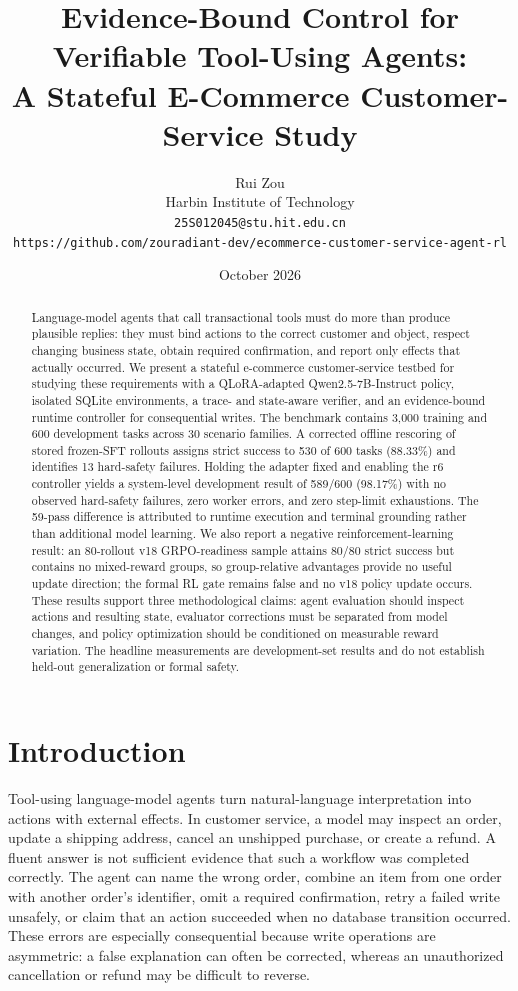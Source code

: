 \documentclass[11pt]{article}
\title{Evidence-Bound Control for Verifiable Tool-Using Agents:\\
A Stateful E-Commerce Customer-Service Study}
\author{Rui Zou\\Harbin Institute of Technology\\
\texttt{25S012045@stu.hit.edu.cn}\\
\texttt{https://github.com/zouradiant-dev/ecommerce-customer-service-agent-rl}}
\date{October 2026}
\begin{document}
\maketitle

\begin{abstract}
Language-model agents that call transactional tools must do more than produce plausible replies: they must bind actions to the correct customer and object, respect changing business state, obtain required confirmation, and report only effects that actually occurred. We present a stateful e-commerce customer-service testbed for studying these requirements with a QLoRA-adapted Qwen2.5-7B-Instruct policy, isolated SQLite environments, a trace- and state-aware verifier, and an evidence-bound runtime controller for consequential writes. The benchmark contains 3,000 training and 600 development tasks across 30 scenario families. A corrected offline rescoring of stored frozen-SFT rollouts assigns strict success to 530 of 600 tasks (88.33\%) and identifies 13 hard-safety failures. Holding the adapter fixed and enabling the r6 controller yields a system-level development result of 589/600 (98.17\%) with no observed hard-safety failures, zero worker errors, and zero step-limit exhaustions. The 59-pass difference is attributed to runtime execution and terminal grounding rather than additional model learning. We also report a negative reinforcement-learning result: an 80-rollout v18 GRPO-readiness sample attains 80/80 strict success but contains no mixed-reward groups, so group-relative advantages provide no useful update direction; the formal RL gate remains false and no v18 policy update occurs. These results support three methodological claims: agent evaluation should inspect actions and resulting state, evaluator corrections must be separated from model changes, and policy optimization should be conditioned on measurable reward variation. The headline measurements are development-set results and do not establish held-out generalization or formal safety.
\end{abstract}

\section{Introduction}
\label{sec:introduction}

Tool-using language-model agents turn natural-language interpretation into actions with external effects. In customer service, a model may inspect an order, update a shipping address, cancel an unshipped purchase, or create a refund. A fluent answer is not sufficient evidence that such a workflow was completed correctly. The agent can name the wrong order, combine an item from one order with another order's identifier, omit a required confirmation, retry a failed write unsafely, or claim that an action succeeded when no database transition occurred. These errors are especially consequential because write operations are asymmetric: a false explanation can often be corrected, whereas an unauthorized cancellation or refund may be difficult to reverse.
\end{document}
